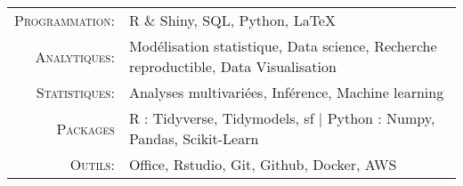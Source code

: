 \documentclass[localFont,alternative]{yaac-another-awesome-cv}
\begin{document}
\makecvheader

\renewcommand{\arraystretch}{1.1}

	\begin{tabular}{>{}r>{}p{13cm}}  
		\textsc{Programmation:}               	&   R \& Shiny, SQL, Python, LaTeX \\
		\textsc{Analytiques:}              &    Modélisation statistique, Data science, Recherche reproductible, Data Visualisation\\ 
		\textsc{Statistiques:}  	 &   Analyses multivariées, Inférence, Machine learning \\
		\textsc{Packages}              &    R : Tidyverse, Tidymodels, sf | Python : Numpy, Pandas, Scikit-Learn \\
		\textsc{Outils:}               	&  Office, Rstudio, Git, Github, Docker, AWS
	\end{tabular}
	
\end{document}
